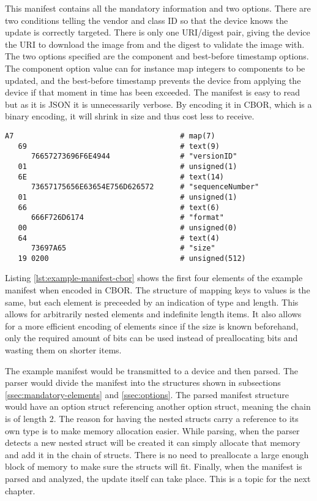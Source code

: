 \documentclass[0-thesis.tex]{subfiles}
\begin{document}
This manifest contains all the mandatory information and two options. There are two
conditions telling the vendor and class ID so that the device knows the update is
correctly targeted. There is only one URI/digest pair, giving the device the URI to
download the image from and the digest to validate the image with. The two options
specified are the component and best-before timestamp options. The component option value
can for instance map integers to components to be updated, and the best-before timestamp
prevents the device from applying the device if that moment in time has been exceeded. The
manifest is easy to read but as it is JSON it is unnecessarily verbose. By encoding it in
CBOR, which is a binary encoding, it will shrink in size and thus cost less to receive.

\begin{lstlisting}[caption={The first four elements of the example manifest in CBOR encoding.},
                    label={lst:example-manifest-cbor}]
A7                                      # map(7)
   69                                   # text(9)
      76657273696F6E4944                # "versionID"
   01                                   # unsigned(1)
   6E                                   # text(14)
      73657175656E63654E756D626572      # "sequenceNumber"
   01                                   # unsigned(1)
   66                                   # text(6)
      666F726D6174                      # "format"
   00                                   # unsigned(0)
   64                                   # text(4)
      73697A65                          # "size"
   19 0200                              # unsigned(512)
\end{lstlisting}

Listing \ref{lst:example-manifest-cbor} shows the first four elements of the example
manifest when encoded in CBOR. The structure of mapping keys to values is the same, but
each element is preceeded by an indication of type and length. This allows for arbitrarily
nested elements and indefinite length items. It also allows for a more efficient encoding
of elements since if the size is known beforehand, only the required amount of bits can be
used instead of preallocating bits and wasting them on shorter items.

The example manifest would be transmitted to a device and then parsed. The parser would
divide the manifest into the structures shown in subsections \ref{ssec:mandatory-elements}
and \ref{ssec:options}. The parsed manifest structure would have an option struct
referencing another option struct, meaning the chain is of length 2. The reason for having
the nested structs carry a reference to its own type is to make memory allocation easier.
While parsing, when the parser detects a new nested struct will be created it can simply
allocate that memory and add it in the chain of structs. There is no need to preallocate a
large enough block of memory to make sure the structs will fit. Finally, when the manifest
is parsed and analyzed, the update itself can take place. This is a topic for the next
chapter.
\end{document}
